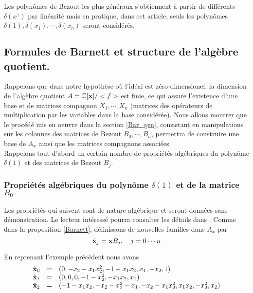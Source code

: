 \documentclass{standalone}
\begin{document}
\begin{rem}
Les polynômes de Bezout les plus généraux s'obtiennent à partir de différents $\delta(x^\gamma)$ par linéarité mais en pratique, dans cet article, seuls les polynômes $\delta(1),\delta(x_1),\cdots,\delta(x_n)$ seront considérés.
\end{rem}

\subsection{Formules de Barnett et structure de l'algèbre quotient.}

Rappelons que dans notre hypothèse où l'idéal est zéro-dimensionel, la dimension de l'algèbre quotient $A = \mathbb{C}[\bold{x}]/<f>$ est finie, ce qui assure l'existence d'une base et de matrices compagnon $X_1,\cdots, X_n$ (matrices des opérateurs de multiplication par les variables dans la base considérée). Nous allons montrer que le procédé mis en oeuvre dans la section \ref{Bar_gen}, consistant en manipulations sur les colonnes des matrices de Bezout $B_0, \cdots, B_n $, permettra de construire une base de $A_x$ ainsi que les matrices compagnons associées.\\
Rappelons tout d'abord un certain nombre de propriétés algébriques du polynôme $\delta(1)$ et des matrices de Bezout $B_j$.

\subsubsection{Propriétés algébriques du polynôme $\delta(1)$ et de la matrice $B_0$}
Les propriétés qui suivent sont de nature algébrique et seront données sans démonstration. Le lecteur intéressé pourra consulter les détails dans \cite{jpc, CM}. Comme dans la proposition \ref{Barnett}, définissons de nouvelles familles dans $A_x$ par
\begin{equation}
		\hat{\bold{x}}_j  =  \bold{x}B_j, \quad j=0\cdots n
\end{equation}

\begin{exmp}
En reprenant l'exemple précédent nous avons
\begin{equation}
	\begin{array}{lll}
		\hat{\bold{x}}_0 & = & (0, -x_2 - x_1x_2^2, -1 - x_1x_2, x_1, -x_2, 1) \\
		\hat{\bold{x}}_1 & = & (0, 0, 0, -1 - x_2^2, -x_1x_2, x_1) \\
		\hat{\bold{x}}_2 & = & (-1 - x_1x_2, -x_2 - x_2^2 - x_1, - x_2 - x_1x_2^2, x_1x_2, -x_2^2, x_2)
	\end{array}
\end{equation}
\end{exmp}
\end{document}
